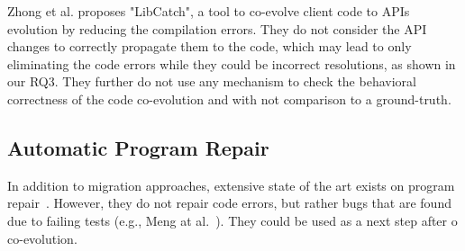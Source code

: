  
 Zhong et al. \cite{10.1145/3597503.3639084} proposes "LibCatch", a tool to co-evolve client code to APIs evolution by reducing the compilation errors. They do not consider the API changes to correctly propagate them to the code, which may lead to only eliminating the code errors while they could be incorrect resolutions, as shown in our RQ3. They further do not use any mechanism to check the behavioral correctness of the code co-evolution and with not comparison to a ground-truth.
 
 
 
 
 
 
 
 \subsection{Automatic Program Repair}
 \label{APR}
 
 In addition to migration approaches, extensive state of the art exists on program repair~\cite{goues2019automated,liu2020efficiency,monperrus2018automatic,gazzola2017automatic}. However, they do not repair code errors, but rather bugs that are found due to failing tests (e.g., Meng at al.~\cite{10.5555/2486788.2486855}). 
 They could be used as a next step after o co-evolution. 
 
